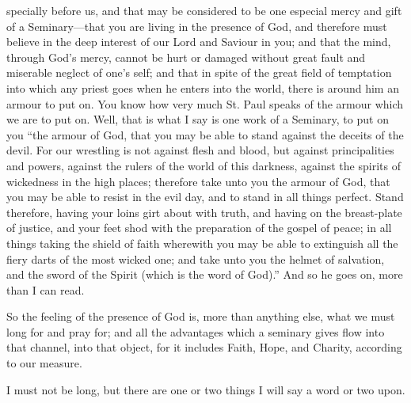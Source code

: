 specially before us, and that may be considered to be one especial
mercy and gift of a Seminary—that you are living in the presence of
God, and therefore must believe in the deep interest of our Lord and
Saviour in you; and that the mind, through God's mercy, cannot be hurt
or damaged without great fault and miserable neglect of one's self;
and that in spite of the great field of temptation into which any
priest goes when he enters into the world, there is around him an
armour to put on. You know how very much St. Paul speaks of the armour
which we are to put on. Well, that is what I say is one work of a
Seminary, to put on you ``the armour of God, that you may be able
to stand against the deceits of the devil. For our wrestling is not
against flesh and blood, but against principalities and powers,
against the rulers of the world of this darkness, against the spirits
of wickedness in the high places; therefore take unto you the armour
of God, that you may be able to resist in the evil day, and to stand
in all things perfect. Stand therefore, having your loins girt about
with truth, and having on the breast-plate of justice, and your feet
shod with the preparation of the gospel of peace; in all things taking
the shield of faith wherewith you may be able to extinguish all the
fiery darts of the most wicked one; and take unto you the helmet of
salvation, and the sword of the Spirit (which is the word of
God).'' And so he goes on, more than I can read.

So the feeling of the presence of God is, more than anything else,
what we must long for and pray for; and all the advantages which a
seminary gives flow into that channel, into that object, for it
includes Faith, Hope, and Charity, according to our measure.

I must not be long, but there are one or two things I will say a
word or two upon.

